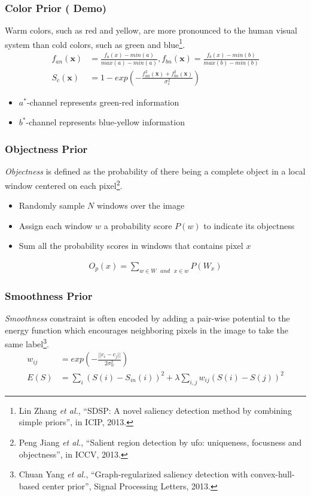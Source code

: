 \documentclass[notheorems,serif,table,compress]{beamer}  %
\begin{document}
\begin{frame}
\frametitle{ Color Prior (\color{yellow} \textbf{Demo})}
{\color{blue}Warm colors, such as red and yellow, are more pronounced to the human visual system than cold colors, such as green and blue}\footnote{Lin Zhang \textit{et al.}, ``SDSP: A novel saliency detection method by combining simple priors'', in ICIP, 2013.}{\color{blue}.}
\begin{align}
f_{an}(\textbf{x}) & =\frac{f_a(x)-min(a)}{max(a)-min(a)}, f_{bn}(\textbf{x}) = \frac{f_b(x)-min(b)}{max(b)-min(b)}\\
S_c(\textbf{x}) & = 1-exp\left(-\frac{f_{an}^2(\textbf{x})+f_{bn}^2(\textbf{x})}{\sigma_c^2}\right)
\end{align}
\begin{itemize}
\item $a^*$-channel represents green-red information
\item $b^*$-channel represents blue-yellow information
\end{itemize}
\end{frame}


\begin{frame}
\frametitle{ Objectness Prior}
{\color{blue}\emph{Objectness}} is defined as the probability of there being a complete object in a local window centered on each pixel\footnote{Peng Jiang \textit{et al.}, ``Salient region detection by ufo: uniqueness, focusness and objectness'', in ICCV, 2013.}.
\begin{itemize}
\item Randomly sample $N$ windows over the image 
\item Assign each window $w$ a probability score $P(w)$ to indicate its objectness
\item Sum all the probability scores in windows that contains pixel $x$
\end{itemize}
\begin{align}
O_p(x) = \sum_{w \in W \text{ }and \text{ } x \in w} P(W_x)
\end{align}
\end{frame}


\begin{frame}
\frametitle{ Smoothness Prior}
{\color{blue}\emph{Smoothness}} constraint is often encoded by adding a pair-wise potential to the energy function which encourages neighboring pixels in the image to take the same label\footnote{Chuan Yang \textit{et al.}, ``Graph-regularized saliency detection with convex-hull-based center prior'', Signal Processing Letters, 2013.}.
\begin{align}
w_{ij} & = exp\left(-\frac{||c_i-c_j||}{2\sigma_w^2}\right)\\
E(S) & = \sum_{i}(S(i)-S_{in}(i))^2+\lambda \sum_{i, j}w_{ij}(S(i)-S(j))^2
\end{align}
\end{frame}
\end{document}
